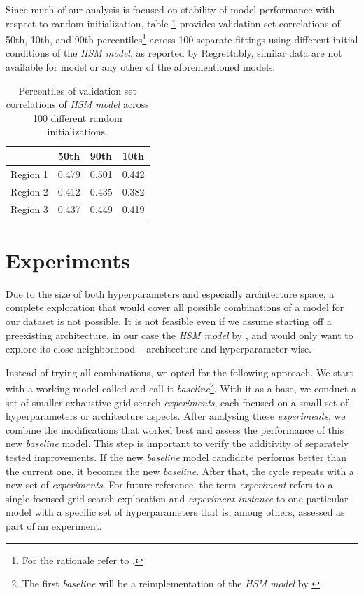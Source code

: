 Since much of our analysis is focused on stability of model performance with respect to random initialization, table \ref{tab:4.3} provides validation set correlations of 50th, 10th, and 90th percentiles\footnote{For the rationale refer to .} across 100 separate fittings using different initial conditions of the \textit{HSM model}, as reported by \citeauthor{antolik} Regrettably, similar data are not available for \citeauthor{klindt} model or any other of the aforementioned models.

\begin{table}[ht]
    \renewcommand{\arraystretch}{1.0}
    \centering
    \begin{tabular}{l|l|l|l}
        \toprule
        & \textbf{50th} & \textbf{90th} & \textbf{10th} \\ \midrule
        Region 1 & 0.479 & 0.501 & 0.442 \\ 
        Region 2 & 0.412 & 0.435 & 0.382 \\ 
        Region 3 & 0.437 & 0.449 & 0.419 \\ \bottomrule

    \end{tabular}
    \caption[Performance percentiles of HSM model]{Percentiles of validation set correlations of \textit{HSM model} across 100 different random initializations.}
    \label{tab:4.3}
    \renewcommand{\arraystretch}{1.0}
\end{table}

\section{Experiments}\label{ch:4.2.1}

Due to the size of both hyperparameters and especially architecture space, a complete exploration that would cover all possible combinations of a model for our dataset is not possible. It is not feasible even if we assume starting off a preexisting architecture, in our case the \textit{HSM model} by \cite{antolik}, and would only want to explore its close neighborhood -- architecture and hyperparameter wise. 

Instead of trying all combinations, we opted for the following approach. We start with a working model called and call it \textit{baseline}\footnote{The first \textit{baseline} will be a reimplementation of the \textit{HSM model} by \cite{antolik}}. With it as a base, we conduct a set of smaller exhaustive grid search \textit{experiments}, each focused on a small set of hyperparameters or architecture aspects. After analysing these \textit{experiments}, we combine the modifications that worked best and assess the performance of this new \textit{baseline} model. This step is important to verify the additivity of separately tested improvements. If the new \textit{baseline} model candidate performs better than the current one, it becomes the new \textit{baseline}. After that, the cycle repeats with a new set of \textit{experiments}. For future reference, the term \textit{experiment} refers to a single focused grid-search exploration and \textit{experiment instance} to one particular model with a specific set of hyperparameters that is, among others, assessed as part of an experiment.

